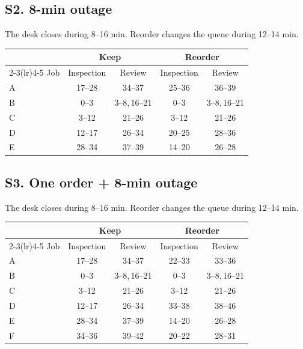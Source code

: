 {\subsection*{S2. 8-min outage}
The desk closes during 8--16 min. Reorder changes the queue during 12--14 min.\par
\begin{center}\small
\begingroup\setlength{\tabcolsep}{5pt}
\begin{tabular}{@{}lcccc@{}}
\toprule
 & \multicolumn{2}{c}{Keep} & \multicolumn{2}{c}{Reorder} \\
\cmidrule(lr){2-3}\cmidrule(lr){4-5}
Job & Inspection & Review & Inspection & Review \\
\midrule
A & 17--28 & 34--37 & 25--36 & 36--39 \\
B & 0--3 & 3--8,\,16--21 & 0--3 & 3--8,\,16--21 \\
C & 3--12 & 21--26 & 3--12 & 21--26 \\
D & 12--17 & 26--34 & 20--25 & 28--36 \\
E & 28--34 & 37--39 & 14--20 & 26--28 \\
\bottomrule
\end{tabular}\endgroup
\end{center}
\subsection*{S3. One order + 8-min outage}
The desk closes during 8--16 min. Reorder changes the queue during 12--14 min.\par
\begin{center}\small
\begingroup\setlength{\tabcolsep}{5pt}
\begin{tabular}{@{}lcccc@{}}
\toprule
 & \multicolumn{2}{c}{Keep} & \multicolumn{2}{c}{Reorder} \\
\cmidrule(lr){2-3}\cmidrule(lr){4-5}
Job & Inspection & Review & Inspection & Review \\
\midrule
A & 17--28 & 34--37 & 22--33 & 33--36 \\
B & 0--3 & 3--8,\,16--21 & 0--3 & 3--8,\,16--21 \\
C & 3--12 & 21--26 & 3--12 & 21--26 \\
D & 12--17 & 26--34 & 33--38 & 38--46 \\
E & 28--34 & 37--39 & 14--20 & 26--28 \\
F & 34--36 & 39--42 & 20--22 & 28--31 \\
\bottomrule
\end{tabular}\endgroup
\end{center}
\clearpage
}
